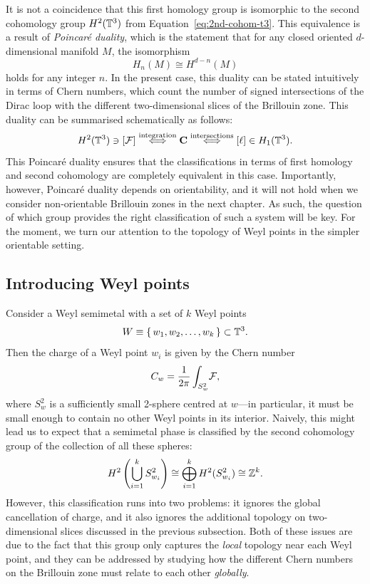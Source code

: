 It is not a coincidence that this first homology group is isomorphic to the second cohomology group $H^2(\mathbb{T}^3)$ from Equation~\eqref{eq:2nd-cohom-t3}. This equivalence is a result of \emph{Poincar\'e duality}, which is the statement that for any closed oriented $d$-dimensional manifold $M$, the isomorphism
\[
	H_n(M) \cong H^{d-n}(M)
\]
holds for any integer $n$. In the present case, this duality can be stated intuitively in terms of Chern numbers, which count the number of signed intersections of the Dirac loop with the different two-dimensional slices of the Brillouin zone. This duality can be summarised schematically as follows:
\begin{equation}\label{eq:duality-scheme}
	H^2(\T^3) \ni [\Fc] \overset{\rm integration}{\iff} %
	\vb{C} \overset{\rm intersections}{\iff} [\ell] \in H_1(\T^3).
\end{equation}
This Poincar\'e duality ensures that the classifications in terms of first homology and second cohomology are completely equivalent in this case. Importantly, however, Poincar\'e duality depends on orientability, and it will not hold when we consider non-orientable Brillouin zones in the next chapter. As such, the question of which group provides the right classification of such a system will be key. For the moment, we turn our attention to the topology of Weyl points in the simpler orientable setting.


\subsection{Introducing Weyl points}\label{sec:Weyl-point-topology}

Consider a Weyl semimetal with a set of $k$ Weyl points
\[
	W \equiv \set{w_1,w_2,\ldots,w_k}\subset \mathbb{T}^3.
\]
Then the charge of a Weyl point $w_i$ is given by the Chern number
\begin{equation*}
	C_w = \frac{1}{2\pi}\int_{S_w^2}\!\mathcal{F},
\end{equation*}
where $S_w^2$ is a sufficiently small 2-sphere centred at $w$---in particular, it must be small enough to contain no other Weyl points in its interior. Naively, this might lead us to expect that a semimetal phase is classified by the second cohomology group of the collection of all these spheres:
\begin{equation}\label{eq:2nd-cohom-spheres}
	H^2\left(\bigcup_{i=1}^k S_{w_i}^2\right)\cong \bigoplus_{i=1}^k H^2(S_{w_i}^2) \cong \mathbb{Z}^k.
\end{equation}
However, this classification runs into two problems: it ignores the global cancellation of charge, and it also ignores the additional topology on two-dimensional slices discussed in the previous subsection. Both of these issues are due to the fact that this group only captures the \emph{local} topology near each Weyl point, and they can be addressed by studying how the different Chern numbers on the Brillouin zone must relate to each other \emph{globally}.

